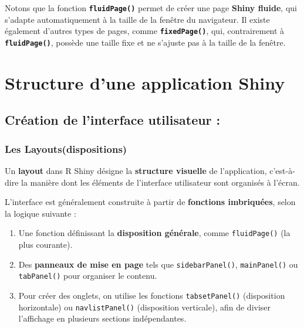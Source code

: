 \documentclass[
]{article}
\providecommand{\tightlist}{%
  \setlength{\itemsep}{0pt}\setlength{\parskip}{0pt}}
\begin{document}
Notons que la fonction \textbf{\texttt{fluidPage()}} permet de créer une
page \textbf{Shiny fluide}, qui s'adapte automatiquement à la taille de
la fenêtre du navigateur. Il existe également d'autres types de pages,
comme \textbf{\texttt{fixedPage()}}, qui, contrairement à
\textbf{\texttt{fluidPage()}}, possède une taille fixe et ne s'ajuste
pas à la taille de la fenêtre.

\newpage

\section{Structure d'une application
Shiny}\label{structure-dune-application-shiny}

\subsection{Création de l'interface utilisateur
:}\label{cruxe9ation-de-linterface-utilisateur}

\subsubsection{Les Layouts(dispositions)}\label{les-layoutsdispositions}

Un \textbf{layout} dans R Shiny désigne la \textbf{structure visuelle}
de l'application, c'est-à-dire la manière dont les éléments de
l'interface utilisateur sont organisés à l'écran.

L'interface est généralement construite à partir de \textbf{fonctions
imbriquées}, selon la logique suivante :

\begin{enumerate}
\def\labelenumi{\arabic{enumi}.}
\tightlist
\item
  Une fonction définissant la \textbf{disposition générale}, comme
  \texttt{fluidPage()} (la plus courante).\\
\item
  Des \textbf{panneaux de mise en page} tels que
  \texttt{sidebarPanel()}, \texttt{mainPanel()} ou \texttt{tabPanel()}
  pour organiser le contenu.\\
\item
  Pour créer des onglets, on utilise les fonctions
  \texttt{tabsetPanel()} (disposition horizontale) ou
  \texttt{navlistPanel()} (disposition verticale), afin de diviser
  l'affichage en plusieurs sections indépendantes.
\end{enumerate}
\end{document}

